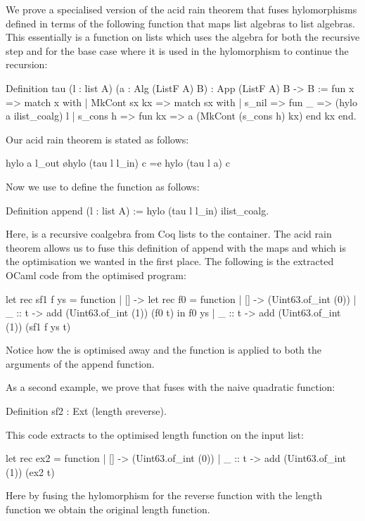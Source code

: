 \documentclass[a4paper,UKenglish,cleveref, autoref, thm-restate]{lipics-v2021}
\begin{document}
We prove a specialised version of the acid rain theorem that fuses
hylomorphisms defined in terms of the following function  that maps
list algebras to list algebras.  This essentially is a function on lists which
uses the algebra for both the recursive step and for the base case where it is
used in the hylomorphism to continue the recursion:
\begin{coqcode}
Definition tau (l : list A) (a : Alg (ListF A) B) : App (ListF A) B -> B :=
  fun x => match x with | MkCont sx kx => match sx with
  | s_nil => fun _ => (hylo a ilist_coalg) l
  | s_cons h => fun kx => a (MkCont (s_cons h) kx)
  end kx end.
\end{coqcode}
Our acid rain theorem is stated as follows:
\begin{coqcode}
  hylo a l_out \o hylo (tau l l_in) c =e hylo (tau l a) c
\end{coqcode}

Now we use  to define the  function as follows:
\begin{coqcode}
Definition append (l : list A) := hylo (tau l l_in) ilist_coalg.
\end{coqcode}
Here,  is a recursive coalgebra from Coq lists to the
 container. The acid rain theorem allows us to fuse this definition
of append with the maps  and  which is the optimisation we
wanted in the first place. The following is the extracted OCaml code from the
optimised program:
\begin{ocamlcode}
let rec sf1 f ys =
  function | [] -> let rec f0 = function
                   | [] -> (Uint63.of_int (0))
                   | _ :: t -> add (Uint63.of_int (1)) (f0 t)
                   in f0 ys
           | _ :: t -> add (Uint63.of_int (1)) (sf1 f ys t)
\end{ocamlcode}
Notice how the  is optimised away and the function  is
applied to both the arguments of the append function.

As a second example, we prove that  fuses with
the naive quadratic  function:
\begin{coqcode}
Definition sf2 : Ext (length \o reverse).
\end{coqcode}
This code extracts to the optimised length function on the input list:
\begin{ocamlcode}
let rec ex2 = function | [] -> (Uint63.of_int (0))
                       | _ :: t -> add (Uint63.of_int (1)) (ex2 t)
\end{ocamlcode}
Here by fusing the hylomorphism for the reverse function with the length
function we obtain the original length function.
\end{document}
